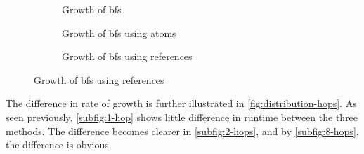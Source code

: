 				\begin{figure}
					\begin{subfigure}[b]{1.0\linewidth}
						
						\caption{Growth of \gls{bfs}}
						\label{fig:growth-bfs}
					\end{subfigure}
					\begin{subfigure}[b]{1.0\linewidth}
						
						\caption{Growth of \gls{bfs} using atoms}
						\label{fig:growth-bfs-atoms}
					\end{subfigure}
					\begin{subfigure}[b]{1.0\linewidth}
						
						\caption{Growth of \gls{bfs} using references}
						\label{fig:growth-bfs-refs}
					\end{subfigure}
				\end{figure}
				
				The difference in rate of growth is further illustrated in \cref{fig:distribution-hops}.  As seen previously, \cref{subfig:1-hop} shows little difference in runtime between the three methods.  The difference becomes clearer in \cref{subfig:2-hops}, and by \cref{subfig:8-hops}, the difference is obvious.
				
